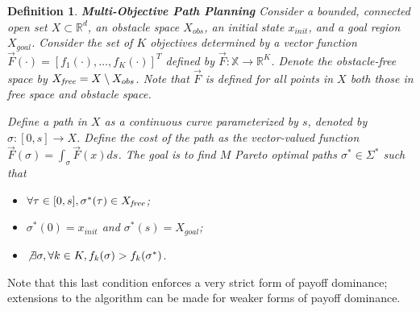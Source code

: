 \documentclass{article}
\newtheorem{defn}{Definition}
\begin{document}
\begin{defn}{ \textbf{Multi-Objective Path Planning} }
Consider a bounded, connected open set $ X \subset \mathbb{R}^{d} $, an obstacle space $ X_{obs} $, an initial state $ x_{init} $, and a goal region $ X_{goal} $. 
Consider the set of $K$ objectives determined by a vector function $ \vec{F}(\cdot) = [ f_{1} (\cdot), \ldots , f_{K}(\cdot) ]^{T}$ defined by $\vec{F}: \mathbb X \rightarrow \mathbb{R}^{K} $. 
Denote the obstacle-free space by $ X_{\it free} = X \setminus X_{obs} $. Note that $\vec{F}$ is defined for all points in $X$ both those in free space and obstacle space.

Define a {\em path} in $X$ as a continuous curve parameterized by $s$, denoted by $\sigma : [0,s] \rightarrow X$. 
Define the cost of the path as the vector-valued function $ \vec{F}(\sigma) = \int_{\sigma} \vec{F}(x)ds $.  
The goal is to find $ M $ Pareto optimal paths $ \sigma^{*} \in \Sigma^{*}$ such that
\begin{itemize}
	\item $\forall \tau\in[0,s], \sigma^*(\tau) \in X_{\it free}$;
	\item $ \sigma^{*} (0) = x_{init} $ and $ \sigma^{*} (s) = X_{goal}  $;
	\item $ \not \exists \sigma , \forall k \in K, f_{k} (\sigma) > f_{k} (\sigma^{*}) $.
\end{itemize}
\end{defn}
\noindent Note that this last condition enforces a very strict form of payoff dominance; extensions to the algorithm can be made for weaker forms of payoff dominance.
\end{document}
